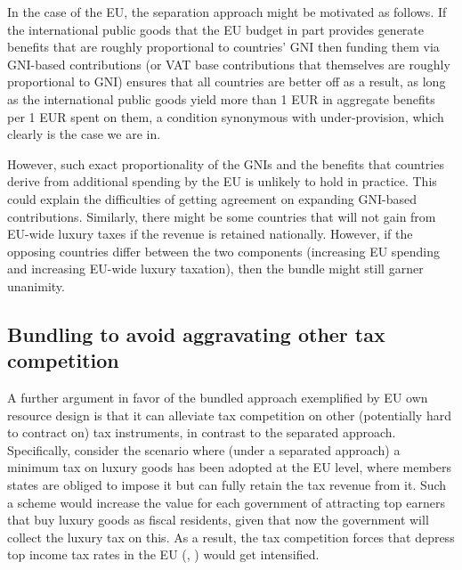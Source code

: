 \documentclass[../../main]{subfiles}
\begin{document}
In the case of the EU, the separation approach might be motivated as follows. If the international public goods that the EU budget in part provides generate benefits that are roughly proportional to countries' GNI then funding them via GNI-based contributions (or VAT base contributions that themselves are roughly proportional to GNI) ensures that all countries are better off as a result, as long as the international public goods yield more than 1 EUR in aggregate benefits per 1 EUR spent on them, a condition synonymous with under-provision, which clearly is the case we are in.

However, such exact proportionality of the GNIs and the benefits that countries derive from additional spending by the EU is unlikely to hold in practice. This could explain the difficulties of getting agreement on expanding GNI-based contributions. Similarly, there might be some countries that will not gain from EU-wide luxury taxes if the revenue is retained nationally. However, if the opposing countries differ between the two components (increasing EU spending and increasing EU-wide luxury taxation), then the bundle might still garner unanimity. %

\subsection{Bundling to avoid aggravating other tax competition}
A further argument in favor of the bundled approach exemplified by EU own resource design is that it can alleviate tax competition on other (potentially hard to contract on) tax instruments, in contrast to the separated approach. Specifically, consider the scenario where (under a separated approach) a minimum tax on luxury goods has been adopted at the EU level, where members states are obliged to impose it but can fully retain the tax revenue from it. Such a scheme would increase the value for each government of attracting top earners that buy luxury goods as fiscal residents, given that now the government will collect the luxury tax on this. As a result, the tax competition forces that depress top income tax rates in the EU (\citet{munoz2021european}, \citet{kleven2011taxation}) would get intensified.
\end{document}
